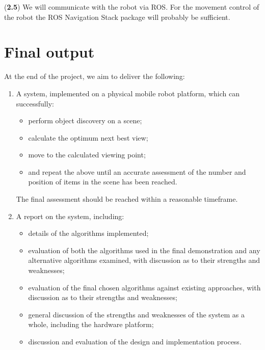 \documentclass[a4paper,11pt,english]{article}
\begin{document}
(\textbf{2.5}) We will communicate with the robot via ROS.
For the movement control of the robot the ROS Navigation Stack package will probably be sufficient.

\section{Final output}\label{finaloutput}

At the end of the project, we aim to deliver the following:

\begin{enumerate}
	
	\item A system, implemented on a physical mobile robot platform, which can successfully:
	\begin{itemize}
		\item perform object discovery on a scene;
		\item calculate the optimum next best view;
		\item move to the calculated viewing point;
		\item and repeat the above until an accurate assessment of the number and position of items in the scene has been reached.
	\end{itemize}
	The final assessment should be reached within a reasonable timeframe.

	\item A report on the system, including:
	\begin{itemize}
		\item details of the algorithms implemented;
		\item evaluation of both the algorithms used in the final demonstration and any alternative algorithms examined, with discussion as to their strengths and weaknesses;
		\item evaluation of the final chosen algorithms against existing approaches, with discussion as to their strengths and weaknesses;
		\item general discussion of the strengths and weaknesses of the system as a whole, including the hardware platform;
		\item discussion and evaluation of the design and implementation process.
	\end{itemize}

\end{enumerate}


\newpage


\end{document}
